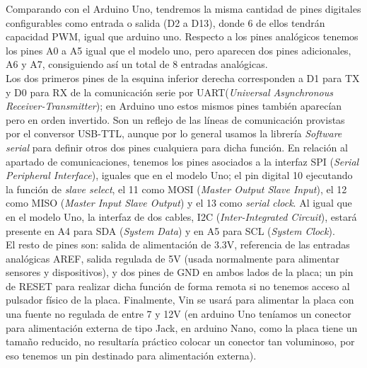 \documentclass[12pt]{article}
\begin{document}
	\noindent Comparando con el Arduino Uno, tendremos la misma cantidad de pines digitales configurables como entrada o salida (D2 a D13), donde 6 de ellos tendrán capacidad PWM, igual que arduino uno. Respecto a los pines analógicos tenemos los pines A0 a A5 igual que el modelo uno, pero aparecen dos pines adicionales, A6 y A7, consiguiendo así un total de 8 entradas analógicas. \\
	
	
	\noindent Los dos primeros pines de la esquina inferior derecha corresponden a D1 para TX y D0 para RX de la comunicación serie por UART(\textit{Universal Asynchronous Receiver-Transmitter}); en Arduino uno estos mismos pines también aparecían pero en orden invertido. Son un reflejo de las líneas de comunicación provistas por el conversor USB-TTL, aunque por lo general usamos la librería \textit{Software serial} para definir otros dos pines cualquiera para dicha función. En relación al apartado de comunicaciones, tenemos los pines asociados a la interfaz SPI (\textit{Serial Peripheral Interface}), iguales que en el modelo Uno; el pin digital 10 ejecutando la función de \textit{slave select}, el 11 como MOSI (\textit{Master Output Slave Input}), el 12 como MISO (\textit{Master Input Slave Output}) y el 13 como \textit{serial clock}. Al igual que en el modelo Uno, la interfaz de dos cables, I2C (\textit{Inter-Integrated Circuit}), estará presente en A4 para SDA (\textit{System Data}) y en A5 para SCL (\textit{System Clock}). \\
	
		
	\noindent El resto de pines son: salida de alimentación de 3.3V, referencia de las entradas analógicas AREF, salida regulada de 5V (usada normalmente para alimentar sensores y dispositivos), y dos pines de GND en ambos lados de la placa; un pin de RESET para realizar dicha función de forma remota si no tenemos acceso al pulsador físico de la placa. Finalmente, Vin se usará para alimentar la placa con una fuente no regulada de entre 7 y 12V (en arduino Uno teníamos un conector para alimentación externa de tipo Jack, en arduino Nano, como la placa tiene un tamaño reducido, no resultaría práctico colocar un conector tan voluminoso, por eso tenemos un pin destinado para alimentación externa). \\
	
\end{document}
